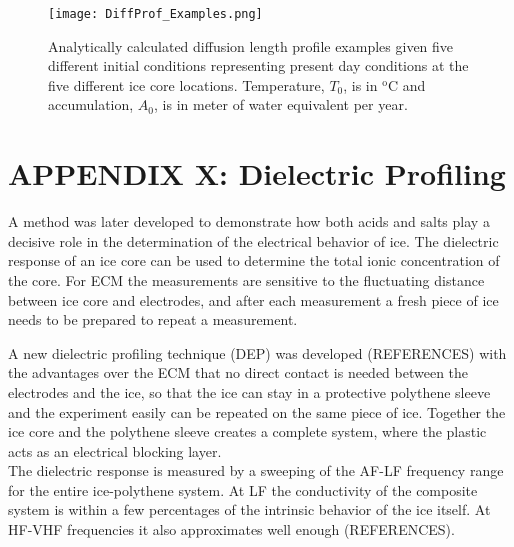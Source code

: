 \documentclass[../../CompleteThesis2/Complete_2ndDraft.tex]{subfiles}
\begin{document}
	\begin{figure}
		\centering
		\texttt{[image: DiffProf\_Examples.png]}
		\caption{Analytically calculated diffusion length profile examples given five different initial conditions representing present day conditions at the five different ice core locations. Temperature, $T_0$, is in $^{\text{o}}$C and accumulation, $A_0$, is in meter of water equivalent per year.}
		\label{Fig:DiffProf_Examples}
	\end{figure}


	\newpage 

	\newpage
	\section[Appendix X]{APPENDIX X: Dielectric Profiling}
	\label{AppX:DEP}
	
	A method was later developed to demonstrate how both acids and salts play a decisive role in the determination of the electrical behavior of ice. The dielectric response of an ice core can be used to determine the total ionic concentration of the core. For ECM the measurements are sensitive to the fluctuating distance between ice core and electrodes, and after each measurement a fresh piece of ice needs to be prepared to repeat a measurement.
	
	A new dielectric profiling technique (DEP) was developed (REFERENCES) with the advantages over the ECM that no direct contact is needed between the electrodes and the ice, so that the ice can stay in a protective polythene sleeve and the experiment easily can be repeated on the same piece of ice. Together the ice core and the polythene sleeve creates a complete system, where the plastic acts as an electrical blocking layer.\\
	The dielectric response is measured by a sweeping of the AF-LF frequency range for the entire ice-polythene system. At LF the conductivity of the composite system is within a few percentages of the intrinsic behavior of the ice itself. At HF-VHF frequencies it also approximates well enough (REFERENCES).
	
\end{document}
